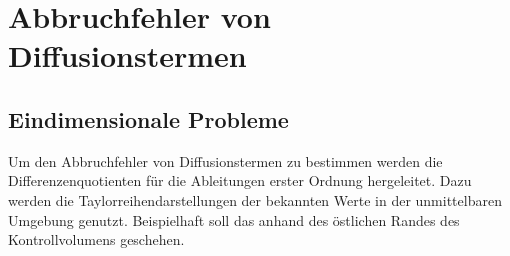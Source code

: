 \section{Abbruchfehler von Diffusionstermen}
\label{sec:Diffusionsterme}

\subsection{Eindimensionale Probleme}

Um den Abbruchfehler von Diffusionstermen zu bestimmen werden die Differenzenquotienten
für die Ableitungen erster Ordnung hergeleitet. Dazu werden die Taylorreihendarstellungen der bekannten
Werte in der unmittelbaren Umgebung genutzt. Beispielhaft soll das anhand des östlichen
Randes des Kontrollvolumens geschehen.

